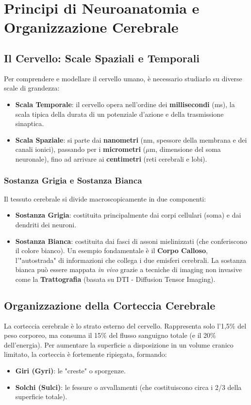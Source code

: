 \chapter{Principi di Neuroanatomia e Organizzazione Cerebrale}

\section{Il Cervello: Scale Spaziali e Temporali}
Per comprendere e modellare il cervello umano, è necessario studiarlo su diverse scale di grandezza:
\begin{itemize}
    \item \textbf{Scala Temporale}: il cervello opera nell'ordine dei \textbf{millisecondi} (ms), la scala tipica della durata di un potenziale d'azione e della trasmissione sinaptica.
    \item \textbf{Scala Spaziale}: si parte dai \textbf{nanometri} (nm, spessore della membrana e dei canali ionici), passando per i \textbf{micrometri} ($\mu$m, dimensione del soma neuronale), fino ad arrivare ai \textbf{centimetri} (reti cerebrali e lobi).
\end{itemize}

\subsection{Sostanza Grigia e Sostanza Bianca}
Il tessuto cerebrale si divide macroscopicamente in due componenti:
\begin{itemize}
    \item \textbf{Sostanza Grigia}: costituita principalmente dai corpi cellulari (soma) e dai dendriti dei neuroni.
    \item \textbf{Sostanza Bianca}: costituita dai fasci di assoni mielinizzati (che conferiscono il colore bianco). Un esempio fondamentale è il \textbf{Corpo Calloso}, l'"autostrada" di informazioni che collega i due emisferi cerebrali.
    La sostanza bianca può essere mappata \textit{in vivo} grazie a tecniche di imaging non invasive come la \textbf{Trattografia} (basata su DTI - Diffusion Tensor Imaging).
\end{itemize}

\section{Organizzazione della Corteccia Cerebrale}
La corteccia cerebrale è lo strato esterno del cervello. Rappresenta solo l'1,5\% del peso corporeo, ma consuma il 15\% del flusso sanguigno totale (e il 20\% dell'energia). Per aumentare la superficie a disposizione in un volume cranico limitato, la corteccia è fortemente ripiegata, formando:
\begin{itemize}
    \item \textbf{Giri (Gyri)}: le "creste" o sporgenze.
    \item \textbf{Solchi (Sulci)}: le fessure o avvallamenti (che costituiscono circa i 2/3 della superficie totale).
\end{itemize}

